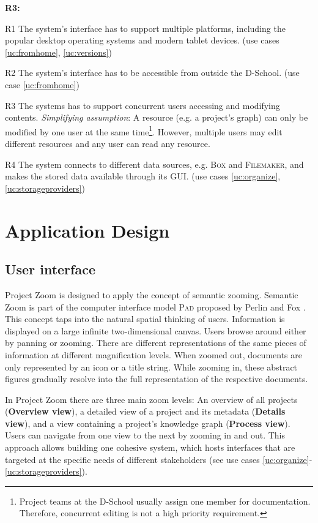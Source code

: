 \begin{labeling}{\textbf{R3:}}
\item[R1\label{req:multiplatform}] The system's interface has to support multiple platforms, including the popular desktop operating systems and modern tablet devices. (use cases \ref{uc:fromhome}, \ref{uc:versions})
\item[R2\label{req:fromhome}] The system's interface has to be accessible from outside the D-School. (use case \ref{uc:fromhome})
\item[R3\label{req:concurrency}] The systems has to support concurrent users accessing and modifying contents. \textit{Simplifying assumption}: A resource (e.g. a project's graph) can only be modified by one user at the same time\footnote{Project teams at the D-School usually assign one member for documentation. Therefore, concurrent editing is not a high priority requirement.}. However, multiple users may edit different resources and any user can read any resource.
\item[R4\label{req:storageprovider}] The system connects to different data sources, e.g. \textsc{Box} and \textsc{Filemaker}, and makes the stored data available through its GUI. (use cases \ref{uc:organize}, \ref{uc:storageproviders})
\end{labeling}

\chapter{Application Design}
\section{User interface}
\label{sec:design}

Project Zoom is designed to apply the concept of semantic zooming. Semantic Zoom is part of the computer interface model \textsc{Pad} proposed by Perlin and Fox \cite{Perlin_1993}. This concept taps into the natural spatial thinking of users. Information is displayed on a large infinite two-dimensional canvas. Users browse around either by panning or zooming. There are different representations of the same pieces of information at different magnification levels. When zoomed out, documents are only represented by an icon or a title string. While zooming in, these abstract figures gradually resolve into the full representation of the respective documents. 

In Project Zoom there are three main zoom levels: An overview of all projects (\textbf{Overview view}), a detailed view of a project and its metadata (\textbf{Details view}), and a view containing a project's knowledge graph (\textbf{Process view}). Users can navigate from one view to the next by zooming in and out. This approach allows building one cohesive system, which hosts interfaces that are targeted at the specific needs of different stakeholders (see use cases \ref{uc:organize}-\ref{uc:storageproviders}). 

